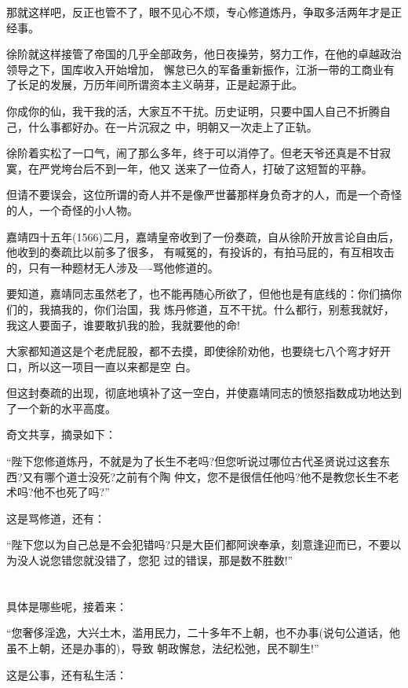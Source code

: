 \documentclass[11pt,a4paper,onecolumn]{article}
\begin{document}
那就这样吧，反正也管不了，眼不见心不烦，专心修道炼丹，争取多活两年才是正经事。

徐阶就这样接管了帝国的几乎全部政务，他日夜操劳，努力工作，在他的卓越政治领导之下，国库收入开始增加，
懈怠已久的军备重新振作，江浙一带的工商业有了长足的发展，万历年间所谓资本主义萌芽，正是起源于此。

你成你的仙，我干我的活，大家互不干扰。历史证明，只要中国人自己不折腾自己，什么事都好办。在一片沉寂之
中，明朝又一次走上了正轨。

徐阶着实松了一口气，闹了那么多年，终于可以消停了。但老天爷还真是不甘寂寞，在严党垮台后不到一年，他又
送来了一位奇人，打破了这短暂的平静。

但请不要误会，这位所谓的奇人并不是像严世蕃那样身负奇才的人，而是一个奇怪的人，一个奇怪的小人物。

嘉靖四十五年(1566)二月，嘉靖皇帝收到了一份奏疏，自从徐阶开放言论自由后，他收到的奏疏比以前多了很多，
有喊冤的，有投诉的，有拍马屁的，有互相攻击的，只有一种题材无人涉及----骂他修道的。

要知道，嘉靖同志虽然老了，也不能再随心所欲了，但他也是有底线的：你们搞你们的，我搞我的，你们治国，我
炼丹修道，互不干扰。什么都行，别惹我就好，我这人要面子，谁要敢扒我的脸，我就要他的命!

大家都知道这是个老虎屁股，都不去摸，即使徐阶劝他，也要绕七八个弯才好开口，所以这一项目一直以来都是空
白。

但这封奏疏的出现，彻底地填补了这一空白，并使嘉靖同志的愤怒指数成功地达到了一个新的水平高度。

奇文共享，摘录如下：

``陛下您修道炼丹，不就是为了长生不老吗?但您听说过哪位古代圣贤说过这套东西?又有哪个道士没死?之前有个陶
仲文，您不是很信任他吗?他不是教您长生不老术吗?他不也死了吗?''

这是骂修道，还有：

``陛下您以为自己总是不会犯错吗?只是大臣们都阿谀奉承，刻意逢迎而已，不要以为没人说您错您就没错了，您犯
过的错误，那是数不胜数!''

\section[\thesection]{}

具体是哪些呢，接着来：

``您奢侈淫逸，大兴土木，滥用民力，二十多年不上朝，也不办事(说句公道话，他虽不上朝，还是办事的)，导致
朝政懈怠，法纪松弛，民不聊生!''

这是公事，还有私生活：
\end{document}
